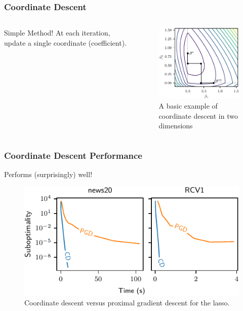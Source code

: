 \documentclass[10pt]{beamer}
\begin{document}
\begin{frame}
  \frametitle{Coordinate Descent}

  \begin{columns}[c]
    \begin{column}{0.35\textwidth}
      \begin{exampleblock}{Simple Method!}
        At each iteration, update a single coordinate (coefficient).
      \end{exampleblock}
    \end{column}
    \begin{column}{0.55\textwidth}
      \begin{figure}[htpb]
        \centering
        \includegraphics[]{figures/paper5-cd.pdf}
        \caption{%
          A basic example of coordinate descent in two dimensions
        }
      \end{figure}
    \end{column}
  \end{columns}
\end{frame}

\begin{frame}
  \frametitle{Coordinate Descent Performance}
  Performs (surprisingly) well!

  \medskip

  \begin{figure}[htpb]
    \centering
    \includegraphics[]{figures/paper5-cd-vs-pgd.pdf}
    \caption{%
      Coordinate descent versus proximal gradient descent for the lasso.
    }
  \end{figure}
\end{frame}
\end{document}
